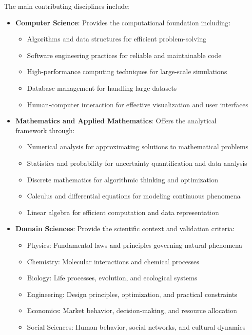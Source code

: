 The main contributing disciplines include:

\begin{itemize}
  \item \textbf{Computer Science}: Provides the computational foundation including:
  \begin{itemize}
    \item Algorithms and data structures for efficient problem-solving
    \item Software engineering practices for reliable and maintainable code
    \item High-performance computing techniques for large-scale simulations
    \item Database management for handling large datasets
    \item Human-computer interaction for effective visualization and user interfaces
  \end{itemize}
      
  \item \textbf{Mathematics and Applied Mathematics}: Offers the analytical framework through:
  \begin{itemize}
    \item Numerical analysis for approximating solutions to mathematical problems
    \item Statistics and probability for uncertainty quantification and data analysis
    \item Discrete mathematics for algorithmic thinking and optimization
    \item Calculus and differential equations for modeling continuous phenomena
    \item Linear algebra for efficient computation and data representation
  \end{itemize}
      
  \item \textbf{Domain Sciences}: Provide the scientific context and validation criteria:
  \begin{itemize}
    \item Physics: Fundamental laws and principles governing natural phenomena
    \item Chemistry: Molecular interactions and chemical processes
    \item Biology: Life processes, evolution, and ecological systems
    \item Engineering: Design principles, optimization, and practical constraints
    \item Economics: Market behavior, decision-making, and resource allocation
    \item Social Sciences: Human behavior, social networks, and cultural dynamics
  \end{itemize}
      

\end{itemize}
